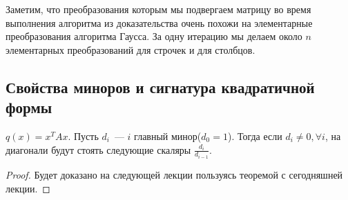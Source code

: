 Заметим, что преобразования которым мы подвергаем матрицу во время выполнения 
алгоритма из доказательства очень похожи на элементарные преобразования
алгоритма Гаусса. За одну итерацию мы делаем около $n$ элементарных
преобразований для строчек и для столбцов.
\subsection{Свойства миноров и сигнатура квадратичной формы}
\begin{theorem}
    $q(x) = x^T Ax$. Пусть $d_i$~--- $i$ главный минор($d_0=1$). Тогда если $d_i \not= 0,\forall i$, на диагонали
    будут стоять следующие скаляры $\frac{d_i}{d_{i - 1}}$.
\end{theorem}
\begin{proof}
    Будет доказано на следующей лекции пользуясь теоремой с сегодняшней лекции.
\end{proof}
